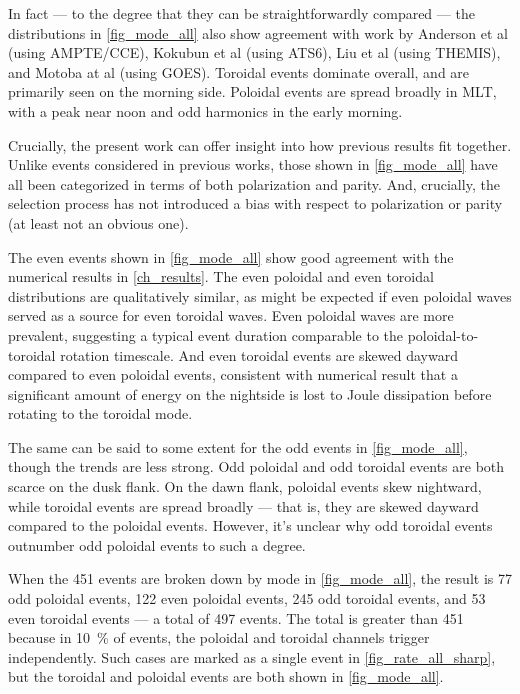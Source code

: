 In fact --- to the degree that they can be straightforwardly compared --- the
distributions in \cref{fig_mode_all} also show agreement with work by
Anderson et al\cite{anderson_1990} (using AMPTE/CCE), Kokubun et 
al\cite{kokubun_1989}
(using ATS6), Liu et al\cite{liu_2009} (using THEMIS), and Motoba at 
al\cite{motoba_2015}
(using GOES). Toroidal events dominate overall, and are primarily seen on the
morning side. Poloidal events are spread broadly in MLT, with a peak near noon
and odd harmonics in the early morning. 

Crucially, the present work can offer insight into how previous results fit
together. Unlike events considered in previous works, those shown in
\cref{fig_mode_all} have all been categorized in terms of both
polarization and parity. And, crucially, the selection process has not
introduced a bias with respect to polarization or parity (at least not an
obvious one). 

The even events shown in \cref{fig_mode_all} show good agreement with the
numerical results in \cref{ch_results}. The even poloidal and even toroidal
distributions are qualitatively similar, as might be expected if even poloidal
waves served as a source for even toroidal waves. Even poloidal waves are more
prevalent, suggesting a typical event duration comparable to the
poloidal-to-toroidal rotation timescale. And even toroidal events are skewed
dayward compared to even poloidal events, consistent with numerical result that
a significant amount of energy on the nightside is lost to Joule dissipation
before rotating to the toroidal mode. 

The same can be said to some extent for the odd events in
\cref{fig_mode_all}, though the trends are less strong. Odd poloidal and
odd toroidal events are both scarce on the dusk flank. On the dawn flank,
poloidal events skew nightward, while toroidal events are spread broadly ---
that is, they are skewed dayward compared to the poloidal events. However, it's
unclear why odd toroidal events outnumber odd poloidal events to such a degree. 

When the 451 events are broken down by mode in \cref{fig_mode_all}, the
result is 77 odd poloidal events, 122 even poloidal events, 245 odd toroidal
events, and 53 even toroidal events --- a total of 497 events. The total is
greater than 451 because in \about\SI{10}{\percent} of events, the poloidal and
toroidal channels trigger independently. Such cases are marked as a single
event in \cref{fig_rate_all_sharp}, but the toroidal and poloidal events are
both shown in \cref{fig_mode_all}. 

